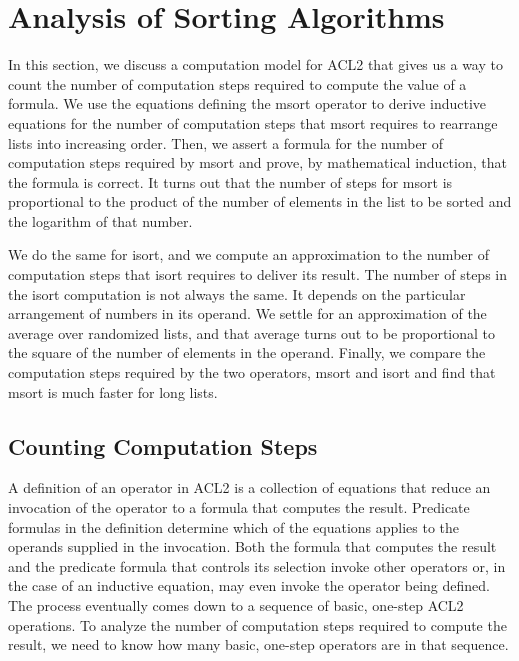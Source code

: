 \section{Analysis of Sorting Algorithms}
\label{sec:sort-analysis}

In this section, we discuss a computation model for ACL2
that gives us a way to count the number of computation steps required
to compute the value of a formula. We use the equations defining
the msort operator to derive inductive equations
for the number of computation steps that msort requires to rearrange lists
into increasing order.
Then, we assert a formula for the number of computation steps required
by msort and prove, by mathematical induction,
that the formula is correct.
It turns out that the number of steps for msort
is proportional to the product of
the number of elements in the list to be sorted
and the logarithm of that number.

We do the same for isort, and
we compute an approximation to the number of computation steps
that isort requires to deliver its result.
The number of steps in the isort computation is not always the same.
It depends on the particular arrangement
of numbers in its operand.
We settle for an approximation of the average over randomized lists,
and that average turns out to be proportional
to the square of the number of elements in the operand.
Finally, we compare the computation steps required by
the two operators, msort and isort and find that
msort is much faster for long lists.

\subsection{Counting Computation Steps}
\label{subsec:counting-computation-steps}

A definition of an operator in ACL2
is a collection of equations that
reduce an invocation of the operator
to a formula that computes the result.
Predicate formulas in the definition determine
which of the equations applies to
the operands supplied in the invocation.
Both the formula that computes the result and
the predicate formula that controls
its selection invoke other operators
or, in the case of an inductive equation,
may even invoke the operator being defined.
The process eventually comes down to a sequence
of basic, one-step ACL2 operations.
To analyze the number of computation steps
required to compute the result,
we need to know how many basic, one-step operators are
in that sequence.


